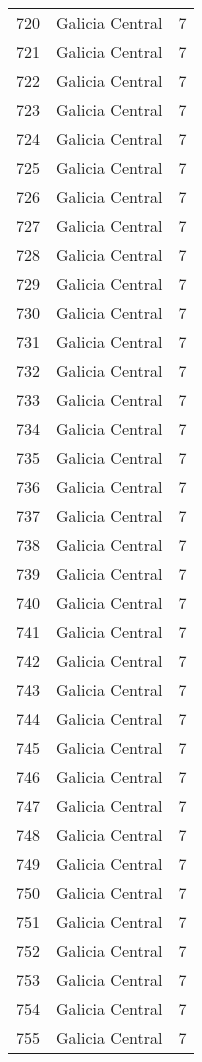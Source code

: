 \begin{table}[p]
\begin{tabular}{rlr}
  720 & Galicia Central &   7 \\ 
  721 & Galicia Central &   7 \\ 
  722 & Galicia Central &   7 \\ 
  723 & Galicia Central &   7 \\ 
  724 & Galicia Central &   7 \\ 
  725 & Galicia Central &   7 \\ 
  726 & Galicia Central &   7 \\ 
  727 & Galicia Central &   7 \\ 
  728 & Galicia Central &   7 \\ 
  729 & Galicia Central &   7 \\ 
  730 & Galicia Central &   7 \\ 
  731 & Galicia Central &   7 \\ 
  732 & Galicia Central &   7 \\ 
  733 & Galicia Central &   7 \\ 
  734 & Galicia Central &   7 \\ 
  735 & Galicia Central &   7 \\ 
  736 & Galicia Central &   7 \\ 
  737 & Galicia Central &   7 \\ 
  738 & Galicia Central &   7 \\ 
  739 & Galicia Central &   7 \\ 
  740 & Galicia Central &   7 \\ 
  741 & Galicia Central &   7 \\ 
  742 & Galicia Central &   7 \\ 
  743 & Galicia Central &   7 \\ 
  744 & Galicia Central &   7 \\ 
  745 & Galicia Central &   7 \\ 
  746 & Galicia Central &   7 \\ 
  747 & Galicia Central &   7 \\ 
  748 & Galicia Central &   7 \\ 
  749 & Galicia Central &   7 \\ 
  750 & Galicia Central &   7 \\ 
  751 & Galicia Central &   7 \\ 
  752 & Galicia Central &   7 \\ 
  753 & Galicia Central &   7 \\ 
  754 & Galicia Central &   7 \\ 
  755 & Galicia Central &   7 \\ 

\end{tabular}
\end{table}
